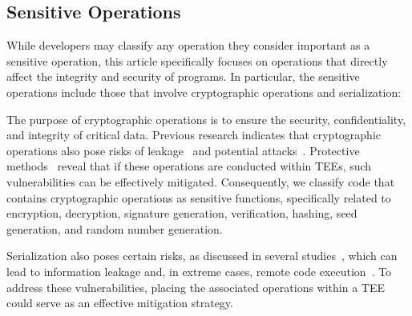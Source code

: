 \subsection{Sensitive Operations}
While developers may classify any operation they consider important as a sensitive operation, this article specifically focuses on operations that directly affect the integrity and security of programs. 
In particular, the sensitive operations include those that involve cryptographic operations and serialization:
\begin{description}[leftmargin = 0pt]
    \item [Cryptographic operation.]
    The purpose of cryptographic operations is to ensure the security, confidentiality, and integrity of critical data.
    Previous research indicates that cryptographic operations also pose risks of leakage~\cite{han2023credential,feng2022automated} and potential attacks~\cite{dziembowski2011leakage,arikan2024tee}.
    Protective methods~\cite{alam2025tee,li2024sedcpt} reveal that if these operations are conducted within TEEs, such vulnerabilities can be effectively mitigated.
    Consequently, we classify code that contains cryptographic operations as sensitive functions, specifically related to encryption, decryption, signature generation, verification, hashing, seed generation, and random number generation.
    
    \item [Serialization.]
    Serialization also poses certain risks, as discussed in several studies~\cite{chen2020countermeasures,zoni2018comprehensive,graux2021preventing,chen2023tabby}, which can lead to information leakage and, in extreme cases, remote code execution~\cite{sayar2023depth}. 
    To address these vulnerabilities, placing the associated operations within a TEE could serve as an effective mitigation strategy.
\end{description}

